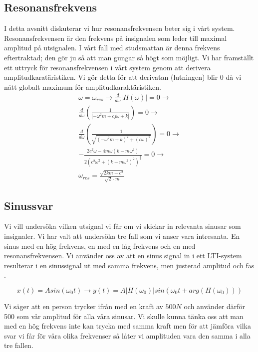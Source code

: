 \documentclass[10pt,a4paper]{article}
\begin{document}
\subsection{Resonansfrekvens}
I detta avsnitt diskuterar vi hur resonansfrekvensen beter sig i vårt system. Resonansfrekvensen är den frekvens på insignalen som leder till maximal amplitud på utsignalen\cite[s.~206]{sune2000}. I vårt fall med studsmattan är denna frekvens eftertraktad; den gör ju så att man gungar så högt som möjligt. Vi har framställt ett uttryck för resonansfrekvensen i vårt system genom att derivera amplitudkaratäristiken. Vi gör detta för att derivatan (lutningen) blir 0 då vi nått globalt maximum för amplitudkaraktäristiken.
\begin{equation}
\begin{split}
\omega=\omega_{res} \rightarrow \frac{d}{d\omega}\left|H(\omega)\right|=0\rightarrow \\ 
\frac{d}{d\omega}\left(\frac{1}{\left|-\omega^2m+cj\omega+k\right|}\right)=0 \rightarrow \\
\frac{d}{d\omega}\left(\frac{1}{\sqrt{(-\omega^2m+k)^2+(c\omega)^2}}\right)=0 \rightarrow \\
-\frac{2c^2\omega-4m\omega(k-m\omega^2)}{2(c^2\omega^2+(k-m\omega^2)^2)^{\frac{3}{2}}}=0 \rightarrow \\
\omega_{res}= \frac{\sqrt{2km - c^2}}{\sqrt{2} \cdot m}
\end{split}
\end{equation}

\newpage
\subsection{Sinussvar}
Vi vill undersöka vilken utsignal vi får om vi skickar in relevanta sinusar som insignaler. Vi har valt att undersöka tre fall som vi anser vara intresanta. En sinus med en hög frekvens, en med en låg frekvens och en med resonansfrekvensen. Vi använder oss av att en sinus signal in i ett LTI-system resulterar i en sinussignal ut med samma frekvens, men justerad amplitud och fas \cite[s.~144]{sune2000}.

\begin{equation}
x(t) = A sin(\omega_0t) \rightarrow y(t) = A|H(\omega_0)|sin(\omega_0t + arg(H(\omega_0)))
\end{equation}

Vi säger att en person trycker ifrån med en kraft av $500N$ och använder därför 500 som vår amplitud för alla våra sinusar. Vi skulle kunna tänka oss att man med en hög frekvens inte kan trycka med samma kraft men för att jämföra vilka svar vi får för våra olika frekvenser så låter vi amplituden vara den samma i alla tre fallen.
\end{document}
